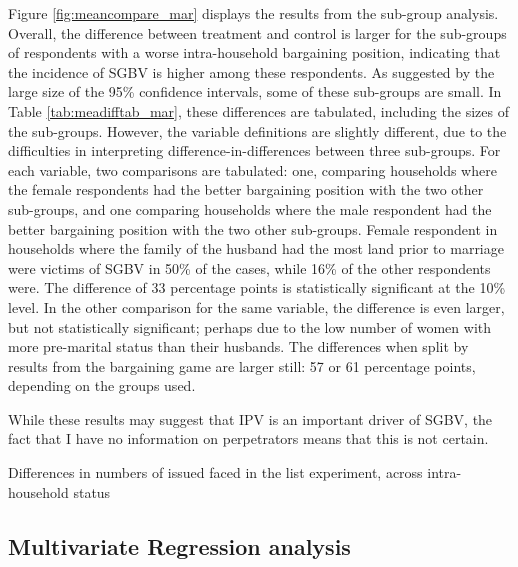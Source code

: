 Figure \ref{fig:meancompare_mar} displays the results from the sub-group analysis. Overall, the difference between treatment and control is larger for the sub-groups of respondents with a worse intra-household bargaining position, indicating that the incidence of SGBV is higher among these respondents. As suggested by the large size of the 95\% confidence intervals, some of these sub-groups are small. In Table \ref{tab:meadifftab_mar}, these differences are tabulated, including the sizes of the sub-groups. However, the variable definitions are slightly different, due to the difficulties in interpreting difference-in-differences between three sub-groups. For each variable, two comparisons are tabulated: one, comparing households where the female respondents had the better bargaining position with the two other sub-groups, and one comparing households where the male respondent had the better bargaining position with the two other sub-groups. Female respondent in households where the family of the husband had the most land prior to marriage were victims of SGBV in 50\% of the cases, while 16\% of the other respondents were. The difference of 33 percentage points is statistically significant at the 10\% level. In the other comparison for the same variable, the difference is even larger, but not statistically significant; perhaps due to the low number of women with more pre-marital status than their husbands. The differences when split by results from the bargaining game are larger still: 57 or 61 percentage points, depending on the groups used.

While these results may suggest that IPV is an important driver of SGBV, the fact that I have no information on perpetrators means that this is not certain.


\begin{table}[htb]
\caption{Differences in numbers of issued faced in the list experiment, across intra-household status}
\label{tab:meadifftab_mar}
\end{table}


\subsection{Multivariate Regression analysis}

